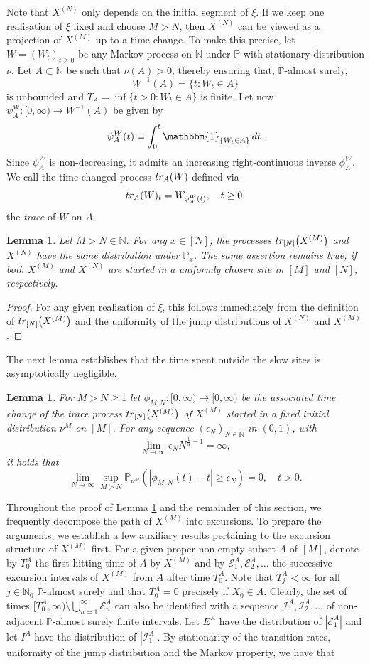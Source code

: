 \documentclass[11pt,a4paper]{scrartcl}
\numberwithin{equation}{section}
\theoremstyle{plain}
\newtheorem{lemma}[theorem]{Lemma}
\theoremstyle{definition}
\theoremstyle{remark}
\newcommand{\bN}{\ensuremath{\mathbb{N}}}
\newcommand{\bP}{\ensuremath{\mathbb{P}}}
\newcommand{\ind}{\ensuremath{\mathbbm{1}}}
\begin{document}
Note that $X^{(N)}$ only depends on the initial segment of $\xi$. If we keep one realisation of $\xi$ fixed and choose $M>N$, then $X^{(N)}$ can be viewed as a projection of $X^{(M)}$ up to a time change. To make this precise, let $W=(W_t)_{t\geq 0}$ be any Markov process on $\bN$ under $\bP$ with stationary distribution $\nu$. Let $A\subset \bN$ be such that $\nu(A)>0$, thereby ensuring that, $\bP$-almost surely,
$$
W^{-1}(A)=\{t: W_t\in A \}
$$
is unbounded and $T_A=\inf\{t>0:W_t\in A\}$ is finite. Let now $\psi^{W}_{A}:[0,\infty)\to W^{-1}(A)$ be given by
$$ \psi^W_{A}(t)=\int_{0}^{t} \ind_{\{ W_t\in A \}}\,\textup{d}t.$$ 
Since $\psi_A^{W}$ is non-decreasing, it admits an increasing right-continuous inverse $\phi_A^W$. We call the time-changed process $\textup{tr}_A(W)$ defined via
$$
\textup{tr}_A(W)_t=W_{\phi^W_A(t)},\quad t\geq 0,
$$
the \emph{trace} of $W$ on $A.$
\begin{lemma}\label{lem:project}
Let $M>N\in\bN$. For any $x\in[N]$, the processes $\textup{tr}_{[N]}\big(X^{(M)}\big)$ and $X^{(N)}$ have the same distribution under $\bP_x$. The same assertion remains true, if both $X^{(M)}$ and $X^{(N)}$ are started in a uniformly chosen site in $[M]$ and $[N]$, respectively.
\end{lemma}
\begin{proof}
For any given realisation of $\xi$, this follows immediately from the definition of $\textup{tr}_{[N]}\big(X^{(M)}\big)$ and the uniformity of the jump distributions of $X^{(N)}$ and $X^{(M)}$.
\end{proof}
The next lemma establishes that the time spent outside the slow sites is asymptotically negligible.
\begin{lemma}\label{lem:notimeoutside}
For $M> N\geq 1$ let $\phi_{M,N}:[0,\infty)\to[0,\infty)$ be the associated time change of the trace process $\textup{tr}_{[N]}\big(X^{(M)}\big)$ of $X^{(M)}$ started in a fixed initial distribution $\nu^M$ on $[M]$. For any sequence $(\epsilon_N)_{N\in\bN}$ in $(0,1)$, with $$
\lim_{N\to\infty}\epsilon_N N^{\frac1\alpha-1}=\infty,
$$
it holds that
$$
\lim_{N\to\infty}\sup_{M > N}\bP_{\nu^M}(|\phi_{M,N}(t)-t|\geq \epsilon_N)=0, \quad t>0.
$$
\end{lemma}
Throughout the proof of Lemma \ref{lem:notimeoutside} and the remainder of this section, we frequently decompose the path of $X^{(M)}$ into excursions. To prepare the arguments, we establish a few auxiliary results pertaining to the excursion structure of $X^{(M)}$ first. For a given proper non-empty subset $A$ of $[M]$, denote by $T_0^A$ the first hitting time of $A$ by $X^{(M)}$ and by $\mathcal{E}^{A}_1,\mathcal{E}^{A}_2,\dots$ the successive excursion intervals of $X^{(M)}$ from $A$ after time $T^A_0$. Note that $T^A_j<\infty$ for all $j\in\bN_0$ $\bP$-almost surely and that $T^A_0=0$ precisely if $X_0\in A.$ Clearly, the set of times $[T^A_0,\infty)\setminus \bigcup_{n=1}^{\infty}\mathcal{E}^A_n$ can also be identified with a sequence $\mathcal{I}^A_1,\mathcal{I}^A_2,\dots$ of non-adjacent $\bP$-almost surely finite intervals. Let $E^A$ have the distribution of $|\mathcal{E}^A_1|$ and let $I^A$ have the distribution of $|\mathcal{I}^A_1|$. By stationarity of the transition rates, uniformity of the jump distribution and the Markov property, we have that
\end{document}
